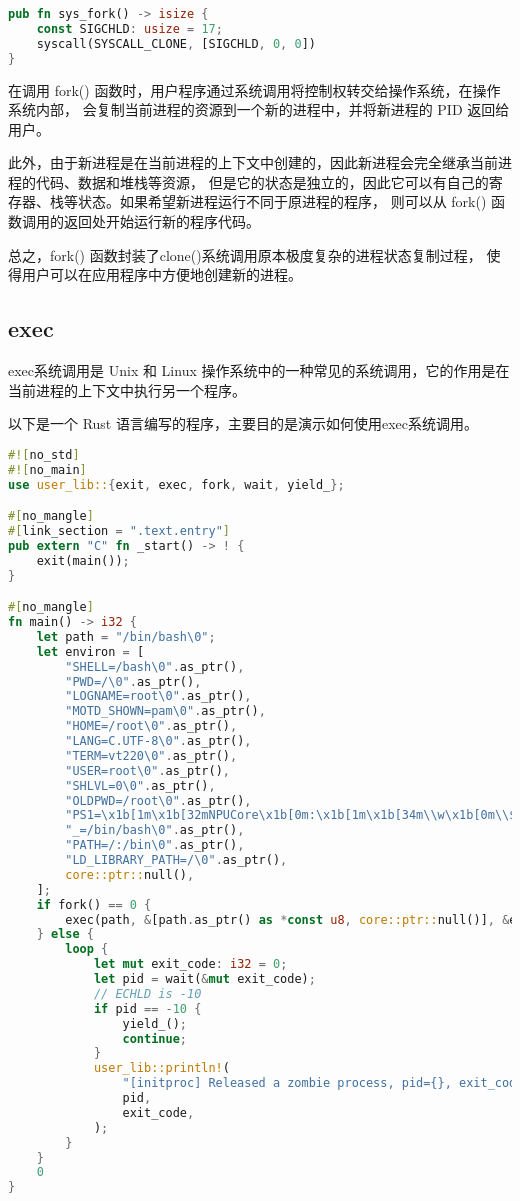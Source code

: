 \begin{lstlisting}[language={Rust}, label={code:sys_fork},
    caption={sys_fork}]
pub fn sys_fork() -> isize {
    const SIGCHLD: usize = 17;
    syscall(SYSCALL_CLONE, [SIGCHLD, 0, 0])
}
\end{lstlisting}

在调用 fork() 函数时，用户程序通过系统调用将控制权转交给操作系统，在操作系统内部，
会复制当前进程的资源到一个新的进程中，并将新进程的 PID 返回给用户。

此外，由于新进程是在当前进程的上下文中创建的，因此新进程会完全继承当前进程的代码、数据和堆栈等资源，
但是它的状态是独立的，因此它可以有自己的寄存器、栈等状态。如果希望新进程运行不同于原进程的程序，
则可以从 fork() 函数调用的返回处开始运行新的程序代码。

总之，fork() 函数封装了clone()系统调用原本极度复杂的进程状态复制过程，
使得用户可以在应用程序中方便地创建新的进程。

\subsection{exec}

exec系统调用是 Unix 和 Linux 操作系统中的一种常见的系统调用，它的作用是在当前进程的上下文中执行另一个程序。

以下是一个 Rust 语言编写的程序，主要目的是演示如何使用exec系统调用。

\begin{lstlisting}[language={Rust}, label={code:exec},
    caption={exec}]
#![no_std]
#![no_main]
use user_lib::{exit, exec, fork, wait, yield_};

#[no_mangle]
#[link_section = ".text.entry"]
pub extern "C" fn _start() -> ! {
    exit(main());
}

#[no_mangle]
fn main() -> i32 {
    let path = "/bin/bash\0";
    let environ = [
        "SHELL=/bash\0".as_ptr(),
        "PWD=/\0".as_ptr(),
        "LOGNAME=root\0".as_ptr(),
        "MOTD_SHOWN=pam\0".as_ptr(),
        "HOME=/root\0".as_ptr(),
        "LANG=C.UTF-8\0".as_ptr(),
        "TERM=vt220\0".as_ptr(),
        "USER=root\0".as_ptr(),
        "SHLVL=0\0".as_ptr(),
        "OLDPWD=/root\0".as_ptr(),
        "PS1=\x1b[1m\x1b[32mNPUCore\x1b[0m:\x1b[1m\x1b[34m\\w\x1b[0m\\$ \0".as_ptr(),
        "_=/bin/bash\0".as_ptr(),
        "PATH=/:/bin\0".as_ptr(),
        "LD_LIBRARY_PATH=/\0".as_ptr(),
        core::ptr::null(),
    ];
    if fork() == 0 {
        exec(path, &[path.as_ptr() as *const u8, core::ptr::null()], &environ);
    } else {
        loop {
            let mut exit_code: i32 = 0;
            let pid = wait(&mut exit_code);
            // ECHLD is -10
            if pid == -10 {
                yield_();
                continue;
            }
            user_lib::println!(
                "[initproc] Released a zombie process, pid={}, exit_code={}",
                pid,
                exit_code,
            );
        }
    }
    0
}
\end{lstlisting}

